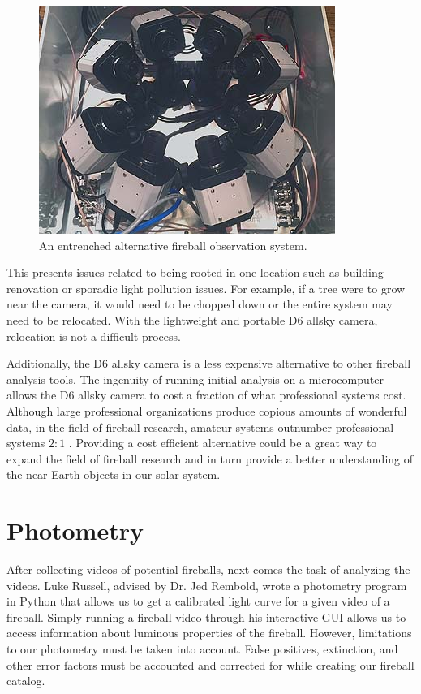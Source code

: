 \begin{figure}[ht!]
  \centering
  \includegraphics[scale=0.7]{images/Florida-CAMSbox-thumb.jpg}
  \caption{An entrenched alternative fireball observation system.}
  \label{immobile}
\end{figure}

This presents issues related to being rooted in one location such as building renovation or sporadic light pollution issues.
For example, if a tree were to grow near the camera, it would need to be chopped down or the entire system may need to be relocated.
With the lightweight and portable D6 allsky camera, relocation is not a difficult process.

Additionally, the D6 allsky camera is a less expensive alternative to other fireball analysis tools.
The ingenuity of running initial analysis on a microcomputer allows the D6 allsky camera to cost a fraction of what professional systems cost.
Although large professional organizations produce copious amounts of wonderful data, in the field of fireball research, amateur systems outnumber professional systems $2:1$ \cite{gural_review_2005}. 
Providing a cost efficient alternative could be a great way to expand the field of fireball research and in turn provide a better understanding of the near-Earth objects in our solar system.


\section{Photometry}
After collecting videos of potential fireballs, next comes the task of analyzing the videos.
Luke Russell, advised by Dr. Jed Rembold, wrote a photometry program in Python that allows us to get a calibrated light curve for a given video of a fireball.
Simply running a fireball video through his interactive GUI allows us to access information about luminous properties of the fireball.
However, limitations to our photometry must be taken into account.
False positives, extinction, and other error factors must be accounted and corrected for while creating our fireball catalog.

